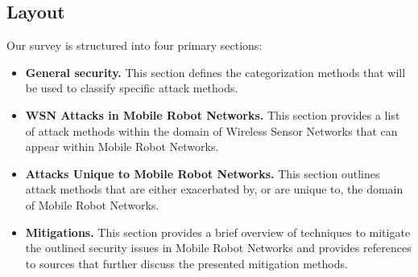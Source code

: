 




\subsection{Layout}

Our survey is structured into four primary sections:

\begin{itemize}[leftmargin = 10pt]
	\item \textbf{General security.} This section defines the categorization methods that will be used to classify specific attack methods.
	\item \textbf{WSN Attacks in Mobile Robot Networks.} This section provides a list of attack methods within the domain of Wireless Sensor Networks that can appear within Mobile Robot Networks.
	\item \textbf{Attacks Unique to Mobile Robot Networks.} This section outlines attack methods that are either exacerbated by, or are unique to, the domain of Mobile Robot Networks.
	\item \textbf{Mitigations.} This section provides a brief overview of techniques to mitigate the outlined security issues in Mobile Robot Networks and provides references to sources that further discuss the presented mitigation methods.
\end{itemize}

